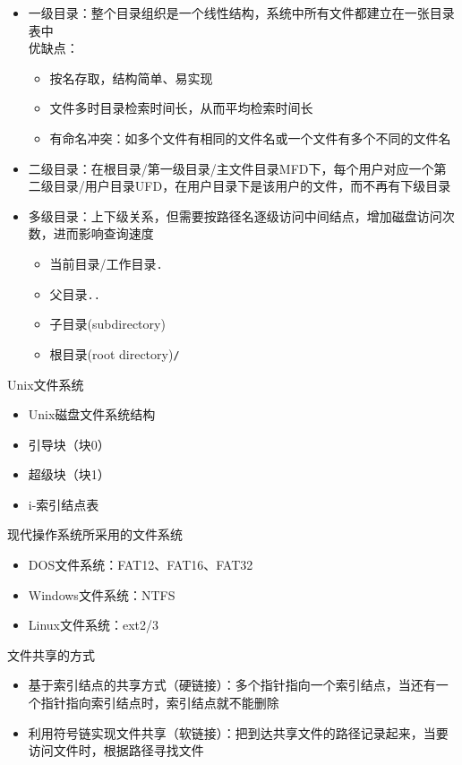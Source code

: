 \begin{itemize}
\item 一级目录：整个目录组织是一个线性结构，系统中所有文件都建立在一张目录表中\\
优缺点：
\begin{itemize}
    \item 按名存取，结构简单、易实现
    \item 文件多时目录检索时间长，从而平均检索时间长
    \item 有命名冲突：如多个文件有相同的文件名或一个文件有多个不同的文件名
\end{itemize}

\item 二级目录：在根目录/第一级目录/主文件目录MFD下，每个用户对应一个第二级目录/用户目录UFD，在用户目录下是该用户的文件，而不再有下级目录

\item 多级目录：上下级关系，但需要按路径名逐级访问中间结点，增加磁盘访问次数，进而影响查询速度
\begin{itemize}
    \item 当前目录/工作目录\verb'.'
    \item 父目录\verb'..'
    \item 子目录(subdirectory)
    \item 根目录(root directory)\verb'/'
\end{itemize}
\end{itemize}

Unix文件系统
\begin{itemize}
    \item Unix磁盘文件系统结构
    \item 引导块（块0）
    \item 超级块（块1）
    \item i-索引结点表
\end{itemize}

现代操作系统所采用的文件系统
\begin{itemize}
\item DOS文件系统：FAT12、FAT16、FAT32
\item Windows文件系统：NTFS
\item Linux文件系统：ext2/3
\end{itemize}

文件共享的方式
\begin{itemize}
    \item 基于索引结点的共享方式（硬链接）：多个指针指向一个索引结点，当还有一个指针指向索引结点时，索引结点就不能删除
    \item 利用符号链实现文件共享（软链接）：把到达共享文件的路径记录起来，当要访问文件时，根据路径寻找文件
\end{itemize}

